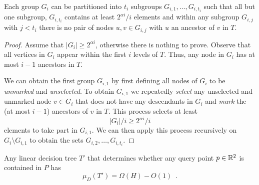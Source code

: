 \documentclass[charterfonts,lotsofwhite]{patmorin}
\begin{document}
\begin{lem}
Each group $G_i$ can be partitioned into $t_i$ subgroups
$G_{i,1},\ldots,G_{i,t_i}$ such that all but one subgroup, $G_{i,t_i}$
contains at least $2^{\alpha i}/i$ elements and within any subgroup
$G_{i,j}$ with $j < t_i$ there is no pair of nodes $u,v\in G_{i,j}$
with $u$ an ancestor of $v$ in $T$.
\end{lem}

\begin{proof}
Assume that $|G_i|\ge 2^{\alpha i}$, otherwise there is nothing to
prove.  Observe that all vertices in $G_i$ appear within the first $i$
levels of $T$.  Thus, any node in $G_i$ has at most $i-1$ ancestors in
$T$.  

We can obtain the first group $G_{i,1}$ by first defining all nodes of
$G_i$ to be \emph{unmarked} and \emph{unselected}.  To obtain
$G_{i,1}$ we repeatedly \emph{select} any unselected and unmarked
node $v\in G_i$ that does not have any descendants in $G_i$ and
\emph{mark} the (at most $i-1$) ancestors of $v$ in $T$.  This
process selects at least
\[
   |G_i|/i \ge 2^{\alpha i}/i
\] 
elements to take part in $G_{i,1}$.  We can then apply this process
recursively on $G_i\setminus G_{i,1}$ to obtain the sets
$G_{i,2},\ldots,G_{i,t_i}$.
\end{proof}


\begin{thm}
Any linear decision tree $T'$ that determines whether any query point 
$p\in\mathbb{R}^2$ is contained in $P$ has
\[
   \mu_D(T') = \Omega(H) - O(1) \enspace .
\]
\end{thm}
\end{document}
